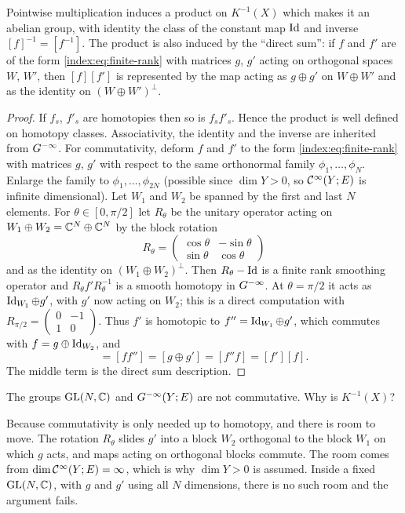 \begin{proposition}\label{index:prop:K1-group}
  Pointwise multiplication induces a product on $K^{-1}(X)$ which makes it an
  abelian group, with identity the class of the constant map $\operatorname{Id}$ and
  inverse $[f]^{-1}=[f^{-1}]$. The product is also induced by the
  ``direct sum'': if $f$ and $f'$ are of the form \eqref{index:eq:finite-rank}
  with matrices $g$, $g'$ acting on orthogonal spaces $W$, $W'$, then
  $[f][f']$ is represented by the map acting as $g\oplus g'$ on $W\oplus W'$
  and as the identity on $(W\oplus W')^\perp$.
\end{proposition}
\begin{proof}
  If $f_s$, $f'_s$ are homotopies then so is $f_sf'_s$. Hence the product is
  well defined on homotopy classes. Associativity, the identity and the inverse
  are inherited from $G^{-\infty}$. For commutativity, deform $f$ and $f'$ to the
  form \eqref{index:eq:finite-rank} with matrices $g$, $g'$ with respect to the
  same orthonormal family $\phi_1,\dots,\phi_N$. Enlarge the family to
  $\phi_1,\dots,\phi_{2N}$ (possible since $\dim Y>0$, so $\mathcal{C}^\infty(Y;E)$ is
  infinite dimensional). Let $W_1$ and $W_2$ be spanned by the first and last
  $N$ elements. For $\theta\in[0,\pi/2]$ let $R_\theta$ be the unitary
  operator acting on $W_1\oplus W_2=\mathbb{C}^N\oplus\mathbb{C}^N$ by the block rotation
  \begin{equation*}
    R_\theta=\begin{pmatrix}\cos\theta&-\sin\theta\\
      \sin\theta&\cos\theta\end{pmatrix}
  \end{equation*}
  and as the identity on $(W_1\oplus W_2)^\perp$. Then $R_\theta-\operatorname{Id}$ is a
  finite rank smoothing operator and $R_\theta f'R_\theta^{-1}$ is a smooth
  homotopy in $G^{-\infty}$. At $\theta=\pi/2$ it acts as $\operatorname{Id}_{W_1}\oplus g'$, with
  $g'$ now acting on $W_2$; this is a direct computation with
  $R_{\pi/2}=\left(\begin{smallmatrix}0&-1\\1&0\end{smallmatrix}\right)$.
  Thus $f'$ is homotopic to $f''=\operatorname{Id}_{W_1}\oplus g'$, which commutes with
  $f=g\oplus\operatorname{Id}_{W_2}$, and
  \begin{equation*}
    [f][f']=[ff'']=[g\oplus g']=[f''f]=[f'][f].
  \end{equation*}
  The middle term is the direct sum description.
\end{proof}

\begin{question}
  The groups $\operatorname{GL}(N,\mathbb{C})$ and $G^{-\infty}(Y;E)$ are not commutative. Why is
  $K^{-1}(X)$?
\end{question}
\begin{answer}
  Because commutativity is only needed up to homotopy, and there is room to move.
  The rotation $R_\theta$ slides $g'$ into a block $W_2$ orthogonal to the block
  $W_1$ on which $g$ acts, and maps acting on orthogonal blocks commute. The room
  comes from $\dim\mathcal{C}^\infty(Y;E)=\infty$, which is why $\dim Y>0$ is assumed. Inside a
  fixed $\operatorname{GL}(N,\mathbb{C})$, with $g$ and $g'$ using all $N$ dimensions, there is no
  such room and the argument fails.
\end{answer}

